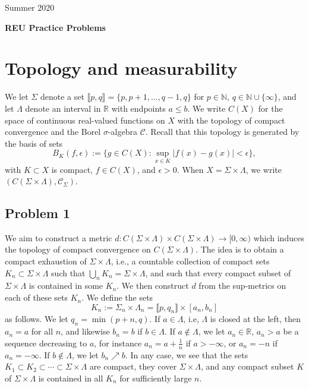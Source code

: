 \documentclass[12pt]{article}
\begin{document}
	\begin{flushright}
		Summer 2020
	\end{flushright}
	
	\begin{center}
		\LARGE\textbf{REU Practice Problems}
	\end{center}


\section{Topology and measurability}

	We let $\Sigma$ denote a set $\llbracket p, q\rrbracket = \{p,p+1,\dots,q-1,q\}$ for $p\in\mathbb{N}$, $q\in\mathbb{N}\cup\{\infty\}$, and let $\Lambda$ denote an interval in $\mathbb{R}$ with endpoints $a\leq b$. We write $C(X)$ for the space of continuous real-valued functions on $X$ with the topology of compact convergence and the Borel $\sigma$-algebra $\mathcal{C}$. Recall that this topology is generated by the basis of sets
	\[
	B_K(f,\epsilon) := \big\{g\in C(X):\sup_{x\in K} |f(x)-g(x)|<\epsilon\big\},
	\]
	with $K\subset X$ is compact, $f\in C(X)$, and $\epsilon>0$. When $X=\Sigma\times\Lambda$, we write $(C(\Sigma\times\Lambda),\mathcal{C}_\Sigma)$.

	\subsection*{Problem 1}
	
		We aim to construct a metric $d:C(\Sigma\times\Lambda)\times C(\Sigma\times\Lambda)\to [0,\infty)$ which induces the topology of compact convergence on $C(\Sigma\times\Lambda)$. The idea is to obtain a compact exhaustion of $\Sigma\times\Lambda$, i.e., a countable collection of compact sets $K_n\subset\Sigma\times\Lambda$ such that $\bigcup_n K_n = \Sigma\times\Lambda$, and such that every compact subset of $\Sigma\times\Lambda$ is contained in some $K_n$. We then construct $d$ from the sup-metrics on each of these sets $K_n$. We define the sets
		\[
		K_n := \Sigma_n \times \Lambda_n = \llbracket p, q_n\rrbracket \times [a_n,b_n]
		\]
		as follows. We let $q_n = \min(p+n,q)$. If $a\in\Lambda$, i.e, $\Lambda$ is closed at the left, then $a_n=a$ for all $n$, and likewise $b_n=b$ if $b\in\Lambda$. If $a\notin\Lambda$, we let $a_n\in\mathbb{R}$, $a_n>a$ be a sequence decreasing to $a$, for instance $a_n=a+\frac{1}{n}$ if $a>-\infty$, or $a_n=-n$ if $a_n=-\infty$. If $b\notin\Lambda$, we let $b_n\nearrow b$. In any case, we see that the sets $K_1\subset K_2\subset\cdots\subset\Sigma\times\Lambda$ are compact, they cover $\Sigma\times\Lambda$, and any compact subset $K$ of $\Sigma\times\Lambda$ is contained in all $K_n$ for sufficiently large $n$.
		
\end{document}

